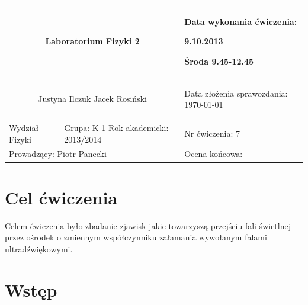 \documentclass[a4paper,12pt]{article}
\author{Justyna Ilczuk, Jacek Rosiński}
\begin{document}
\begin{center}

    \begin{tabular}{ | m{5cm}| m{5cm} | m{5cm} |}
    \hline 
    \multicolumn{2}{|c|}{{ \Large \textbf{Laboratorium Fizyki 2}} }
    &  
    \begin{center}
    Data wykonania ćwiczenia:
    \end{center}
    \begin{center}
      9.10.2013 
    \end{center}
    \begin{center}
    Środa 9.45-12.45
    \end{center}
     \\ 
    
    \hline
    \multicolumn{2}{|c|}{Justyna Ilczuk \newline Jacek Rosiński}
    & \begin{center}
    {\small Data złożenia sprawozdania:} \newline \today
    \end{center}   \\
   	
   	\hline
    Wydział Fizyki & Grupa: K-1 \newline Rok akademicki: 2013/2014 &    Nr ćwiczenia: 7 \\
   	\hline
   	\multicolumn{2}{|l|}{Prowadzący: Piotr Panecki} & \multicolumn{1}{|l|}{Ocena końcowa:}\\
    \hline
    \end{tabular}
\end{center}

\newpage

\pagestyle{fancy}
\fancyfoot[CO]{\ }
\fancyhead[RO]{\footnotesize{\thepage} }


\section{Cel ćwiczenia}

Celem ćwiczenia było zbadanie zjawisk jakie towarzyszą przejściu fali świetlnej przez ośrodek o zmiennym współczynniku załamania wywołanym falami ultradźwiękowymi. 

\section{Wstęp}
\end{document}
